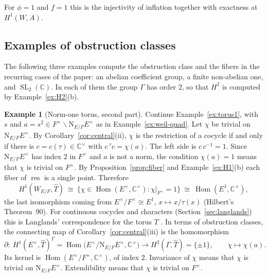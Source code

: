 \documentclass[12pt,letterpaper]{article}
\numberwithin{equation}{section}
\theoremstyle{plain}
\theoremstyle{definition}
\newtheorem{example}[theorem]{Example}
\newcommand{\C}{\mathbb{C}}
\newcommand{\Th}{\widehat{T}}
\newcommand{\act}[2]{{}^{#1}\!#2}          %
\DeclareMathOperator{\Hom}{Hom}
\DeclareMathOperator{\SL}{SL}
\DeclareMathOperator{\res}{res}
\newcommand{\Nm}{\mathrm{N}_{E/F}}
\begin{document}
For $\phi=1$ and $f=1$ this is the injectivity of inflation together with
exactness at $H^1(W,A)$.

\subsection{Examples of obstruction classes}

The following three examples compute the obstruction class and the
fibers in the recurring cases of the paper: an abelian coefficient group,
a finite non-abelian one, and $\SL_2(\C)$. In each of them the group
$\Gamma$ has order $2$, so that $H^2$ is computed by
Example~\ref{ex:H2}(b).

\begin{example}[Norm-one torus, second part]\label{ex:torus2}
Continue Example~\ref{ex:torus1}, with $s$ and $a=s^2\in
F^\times\smallsetminus\Nm E^\times$ as in Example~\ref{ex:weil-quad}. Let
$\chi$ be trivial on $\Nm E^\times$. By Corollary~\ref{cor:central}(ii),
$\chi$ is the restriction of a cocycle if and only if there is
$c=c(\tau)\in\C^\times$ with $c\,\act{\tau}{c}=\chi(a)$. The left side is
$c\,c^{-1}=1$. Since $\Nm E^\times$ has index $2$ in $F^\times$ and $a$ is
not a norm, the condition $\chi(a)=1$ means that $\chi$ is trivial on
$F^\times$. By Proposition~\ref{prop:fiber} and Example~\ref{ex:H1}(b)
each fiber of $\res$ is a single point. Therefore
\[
H^1(W_{E/F},\Th)\ \cong\ \{\chi\in\Hom(E^\times,\C^\times):
\chi|_{F^\times}=1\}\ \cong\ \Hom(E^1,\C^\times),
\]
the last isomorphism coming from $E^\times/F^\times\cong E^1$,
$x\mapsto x/\tau(x)$ (Hilbert's Theorem~90). For continuous cocycles and
characters (Section~\ref{sec:langlands}) this is Langlands' correspondence
for the torus $T$ \cite{La97}. In terms of obstruction classes, the
connecting map of Corollary~\ref{cor:central}(iii) is the homomorphism
\[
\partial:\ H^1(E^\times,\Th)^\Gamma
=\Hom\bigl(E^\times/\Nm E^\times,\C^\times\bigr)
\longrightarrow H^2(\Gamma,\Th)=\{\pm1\},\qquad\chi\longmapsto\chi(a).
\]
Its kernel is $\Hom(E^\times/F^\times,\C^\times)$, of index $2$.
Invariance of $\chi$ means that $\chi$ is trivial on $\Nm E^\times$.
Extendibility means that $\chi$ is trivial on $F^\times$.
\end{example}
\end{document}
